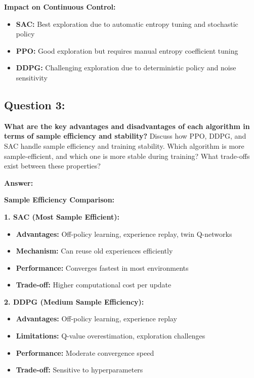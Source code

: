 \documentclass[12pt]{article}
\begin{document}
{{{\textbf{Impact on Continuous Control:}
\begin{itemize}
    \item \textbf{SAC:} Best exploration due to automatic entropy tuning and stochastic policy
    \item \textbf{PPO:} Good exploration but requires manual entropy coefficient tuning
    \item \textbf{DDPG:} Challenging exploration due to deterministic policy and noise sensitivity
\end{itemize}

\subsection{Question 3:}
\textbf{What are the key advantages and disadvantages of each algorithm in terms of sample efficiency and stability?}
\newline
Discuss how PPO, DDPG, and SAC handle sample efficiency and training stability. Which algorithm is more sample-efficient, and which one is more stable during training? What trade-offs exist between these properties?

\textbf{Answer:}

\textbf{Sample Efficiency Comparison:}

\textbf{1. SAC (Most Sample Efficient):}
\begin{itemize}
    \item \textbf{Advantages:} Off-policy learning, experience replay, twin Q-networks
    \item \textbf{Mechanism:} Can reuse old experiences efficiently
    \item \textbf{Performance:} Converges fastest in most environments
    \item \textbf{Trade-off:} Higher computational cost per update
\end{itemize}

\textbf{2. DDPG (Medium Sample Efficiency):}
\begin{itemize}
    \item \textbf{Advantages:} Off-policy learning, experience replay
    \item \textbf{Limitations:} Q-value overestimation, exploration challenges
    \item \textbf{Performance:} Moderate convergence speed
    \item \textbf{Trade-off:} Sensitive to hyperparameters
\end{itemize}

}}}
\end{document}

